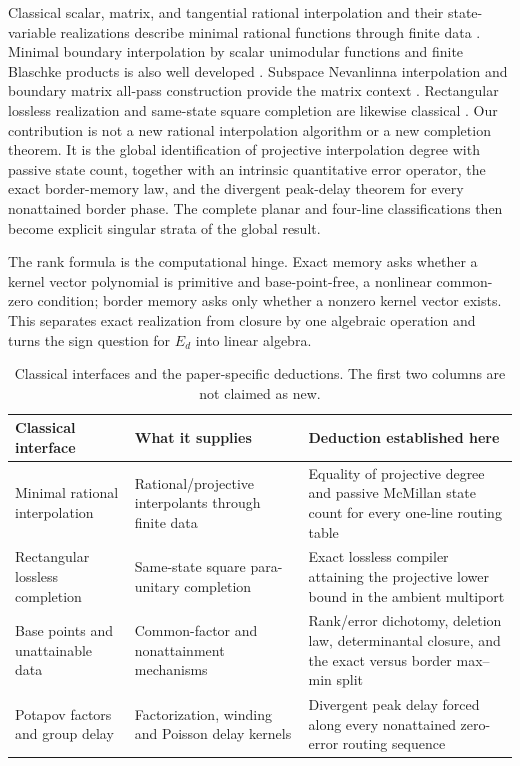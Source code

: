 \documentclass[11pt]{article}
\theoremstyle{definition}\newtheorem{definition}[theorem]{Definition}\newtheorem{example}[theorem]{Example}
\theoremstyle{remark}\newtheorem{remark}[theorem]{Remark}\newtheorem{limitation}[theorem]{Limitation}
\begin{document}
Classical scalar, matrix, and tangential rational interpolation and their
state-variable realizations describe minimal rational functions through finite
data \cite{AntoulasAnderson1986,AndersonAntoulas1990,AntoulasEtAl1990,Ravi1997,CortadellasEtAl2020}.
Minimal boundary interpolation by scalar unimodular functions and finite
Blaschke products is also well developed
\cite{Glader2006,SemmlerWegert2006,Bolotnikov2018}.  Subspace Nevanlinna
interpolation and boundary matrix all-pass construction provide the matrix
context \cite{RapisardaWillems1997,BolotnikovDym2006,BharathEtAl2023}.
Rectangular lossless realization and same-state square completion are likewise
classical \cite{AlpayJorgensenLewkowicz2016}.  Our contribution is not a new
rational interpolation algorithm or a new completion theorem.  It is the
global identification of projective interpolation degree with passive state
count, together with an intrinsic quantitative error operator, the exact
border-memory law, and the divergent peak-delay theorem for every nonattained
border phase.  The complete planar and four-line classifications then become
explicit singular strata of the global result.

The rank formula is the computational hinge.  Exact memory asks whether a
kernel vector polynomial is primitive and base-point-free, a nonlinear common-
zero condition; border memory asks only whether a nonzero kernel vector exists.
This separates exact realization from closure by one algebraic operation and
turns the sign question for $E_d$ into linear algebra.

\begin{table}[t]
\centering
\small
\caption{Classical interfaces and the paper-specific deductions.  The first
two columns are not claimed as new.}
\label{tab:known-new}
\begin{tabular}{L{0.23\textwidth}L{0.29\textwidth}L{0.39\textwidth}}
\toprule
Classical interface & What it supplies & Deduction established here\\
\midrule
Minimal rational interpolation
\cite{AntoulasEtAl1990,Ravi1997}
& Rational/projective interpolants through finite data
& Equality of projective degree and passive McMillan state count for every
one-line routing table\\
Rectangular lossless completion
\cite{AlpayJorgensenLewkowicz2016}
& Same-state square para-unitary completion
& Exact lossless compiler attaining the projective lower bound in the ambient
multiport\\
Base points and unattainable data
\cite{Glader2008,CortadellasUnattainable2018}
& Common-factor and nonattainment mechanisms
& Rank/error dichotomy, deletion law, determinantal closure, and the exact
versus border max--min split\\
Potapov factors and group delay
\cite{Potapov1955,Wigner1955,Smith1960}
& Factorization, winding and Poisson delay kernels
& Divergent peak delay forced along every nonattained zero-error routing
sequence\\
\bottomrule
\end{tabular}
\end{table}
\end{document}
